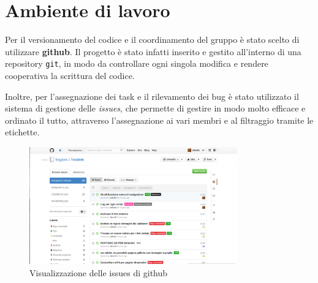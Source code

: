 \section{Ambiente di lavoro}

Per il versionamento del codice e il coordinamento del gruppo è stato scelto di utilizzare \textbf{github}. Il progetto è stato infatti inserito e gestito all'interno di una repository \texttt{git}, in modo da controllare ogni singola modifica e rendere cooperativa la scrittura del codice.

Inoltre, per l'assegnazione dei task e il rilevamento dei bug è stato utilizzato il sistema di gestione delle \textit{issues}, che permette di gestire in modo molto efficace e ordinato il tutto, attraverso l'assegnazione ai vari membri e al filtraggio tramite le etichette.

\begin{figure}[H]
		\centering \includegraphics[width=0.8\textwidth]{images/github.png}
		\caption{Visualizzazione delle issues di github}
\end{figure}

